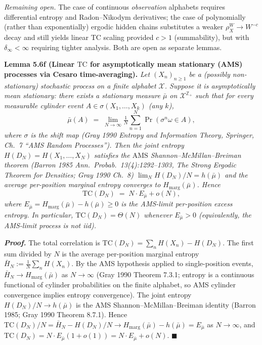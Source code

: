 \documentclass[
]{article}
\begin{document}
\emph{Remaining open.} The case of continuous \emph{observation}
alphabets requires differential entropy and Radon--Nikodym derivatives;
the case of polynomially (rather than exponentially) ergodic hidden
chains substitutes a weaker $\rho_X^W \to W^{-c}$ decay and still
yields linear TC scaling provided $c > 1$ (summability), but with
$\delta_\infty < \infty$ requiring tighter analysis. Both are open
as separate lemmas.

\textbf{Lemma 5.6f (Linear $\mathrm{TC}$ for asymptotically mean
stationary (AMS) processes via Cesaro time-averaging).}
\emph{Let $(X_n)_{n \geq 1}$ be a (possibly non-stationary) stochastic
process on a finite alphabet $\mathcal{X}$. Suppose it is
\emph{asymptotically mean stationary}: there exists a stationary
measure $\bar{\mu}$ on $\mathcal{X}^{\mathbb{Z}_+}$ such that for
every measurable cylinder event $A \in \sigma(X_1, \ldots, X_k)$
(any $k$),}
\[
\bar{\mu}(A) \;=\; \lim_{N \to \infty} \tfrac{1}{N} \sum_{n=1}^N
  \Pr(\sigma^n \omega \in A),
\]
\emph{where $\sigma$ is the shift map (Gray 1990 \emph{Entropy and
Information Theory}, Springer, Ch.\ 7 ``AMS Random Processes''). Then
the joint entropy $H(D_N) = H(X_1, \ldots, X_N)$ satisfies the
$\mathrm{AMS}$ Shannon--McMillan--Breiman theorem
(Barron 1985 \emph{Ann.\ Probab.}\ 13(4):1292--1303,
\emph{The Strong Ergodic Theorem for Densities}; Gray 1990 Ch.\ 8)
$\lim_N H(D_N)/N = h(\bar{\mu})$ and the average per-position
marginal entropy converges to $H_{\mathrm{marg}}(\bar{\mu})$. Hence}
\[
\mathrm{TC}(D_N) \;=\; N \cdot E_{\bar{\mu}} + o(N),
\]
\emph{where $E_{\bar{\mu}} = H_{\mathrm{marg}}(\bar{\mu}) -
h(\bar{\mu}) \geq 0$ is the AMS-limit per-position excess entropy.
In particular, $\mathrm{TC}(D_N) = \Theta(N)$ whenever
$E_{\bar{\mu}} > 0$ (equivalently, the AMS-limit process is not iid).}

\emph{\textbf{Proof.}} The total correlation is
$\mathrm{TC}(D_N) = \sum_n H(X_n) - H(D_N)$. The first sum
divided by $N$ is the average per-position marginal entropy
$\bar{H}_N := \tfrac{1}{N} \sum_n H(X_n)$. By the AMS hypothesis
applied to single-position events,
$\bar{H}_N \to H_{\mathrm{marg}}(\bar{\mu})$ as $N \to \infty$ (Gray
1990 Theorem 7.3.1; entropy is a continuous functional of cylinder
probabilities on the finite alphabet, so AMS cylinder convergence
implies entropy convergence). The joint entropy
$H(D_N)/N \to h(\bar{\mu})$ is the AMS Shannon--McMillan--Breiman
identity (Barron 1985; Gray 1990 Theorem 8.7.1). Hence
$\mathrm{TC}(D_N)/N = \bar{H}_N - H(D_N)/N \to H_{\mathrm{marg}}(\bar{\mu})
- h(\bar{\mu}) = E_{\bar{\mu}}$ as $N \to \infty$, and
$\mathrm{TC}(D_N) = N \cdot E_{\bar{\mu}}(1 + o(1)) = N \cdot E_{\bar{\mu}}
+ o(N)$.
\hfill$\blacksquare$
\end{document}
